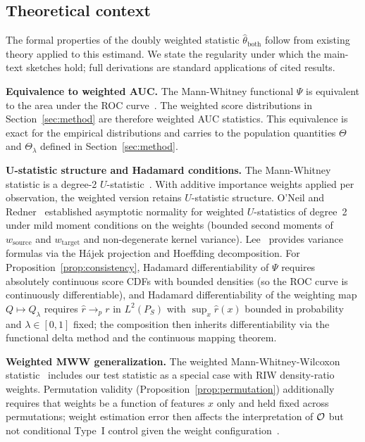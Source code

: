 \subsection{Theoretical context}

The formal properties of the doubly weighted statistic $\hat\theta_{\mathrm{both}}$ follow from existing theory applied to this estimand. We state the regularity under which the main-text sketches hold; full derivations are standard applications of cited results.

\textbf{Equivalence to weighted AUC.} The Mann-Whitney functional $\Psi$ is equivalent to the area under the ROC curve~\cite{Hanley_1982}. The weighted score distributions in Section~\ref{sec:method} are therefore weighted AUC statistics. This equivalence is exact for the empirical distributions and carries to the population quantities $\Theta$ and $\Theta_\lambda$ defined in Section~\ref{sec:method}.

\textbf{U-statistic structure and Hadamard conditions.} The Mann-Whitney statistic is a degree-2 $U$-statistic~\cite{Lee_1990}. With additive importance weights applied per observation, the weighted version retains $U$-statistic structure. O'Neil and Redner~\cite{ONeil_1993} established asymptotic normality for weighted $U$-statistics of degree~2 under mild moment conditions on the weights (bounded second moments of $w_{\mathrm{source}}$ and $w_{\mathrm{target}}$ and non-degenerate kernel variance). Lee~\cite{Lee_1990} provides variance formulas via the H\'ajek projection and Hoeffding decomposition. For Proposition~\ref{prop:consistency}, Hadamard differentiability of $\Psi$ requires absolutely continuous score CDFs with bounded densities (so the ROC curve is continuously differentiable), and Hadamard differentiability of the weighting map $Q \mapsto Q_\lambda$ requires $\hat{r} \to_p r$ in $L^2(P_S)$ with $\sup_x \hat{r}(x)$ bounded in probability and $\lambda \in [0,1]$ fixed; the composition then inherits differentiability via the functional delta method and the continuous mapping theorem.

\textbf{Weighted MWW generalization.} The weighted Mann-Whitney-Wilcoxon statistic~\cite{Xie_2002} includes our test statistic as a special case with RIW density-ratio weights. Permutation validity (Proposition~\ref{prop:permutation}) additionally requires that weights be a function of features $x$ only and held fixed across permutations; weight estimation error then affects the interpretation of $\mathcal{O}$ but not conditional Type~I control given the weight configuration~\cite{Lehmann_2005}.

